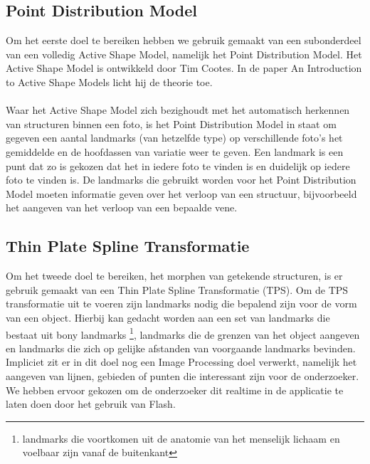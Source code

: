 \subsection{Point Distribution Model}
Om het eerste doel te bereiken hebben we gebruik gemaakt van een subonderdeel van een volledig Active Shape Model, namelijk het Point Distribution Model. Het Active Shape Model is ontwikkeld door Tim Cootes. In de paper An Introduction to Active Shape Models licht hij de theorie toe.\cite{introASM}
\\
\\
Waar het Active Shape Model zich bezighoudt met het automatisch herkennen van structuren binnen een foto, is het Point Distribution Model\cite{pdm} in staat om gegeven een aantal landmarks (van hetzelfde type) op verschillende foto's het gemiddelde en de hoofdassen van variatie weer te geven. Een landmark is een punt dat zo is gekozen dat het in iedere foto te vinden is en duidelijk op iedere foto te vinden is. De landmarks die gebruikt worden voor het Point Distribution Model moeten informatie geven over het verloop van een structuur, bijvoorbeeld het aangeven van het verloop van een bepaalde vene.

\subsection{Thin Plate Spline Transformatie}
Om het tweede doel te bereiken, het morphen van getekende structuren, is er gebruik gemaakt van een Thin Plate Spline Transformatie (TPS). Om de TPS transformatie uit te voeren zijn landmarks nodig die bepalend zijn voor de vorm van een object. Hierbij kan gedacht worden aan een set van landmarks die bestaat uit bony landmarks \footnote{landmarks die voortkomen uit de anatomie van het menselijk lichaam en voelbaar zijn vanaf de buitenkant}, landmarks die de grenzen van het object aangeven en landmarks die zich op gelijke afstanden van voorgaande landmarks bevinden. 
Impliciet zit er in dit doel nog een Image Processing doel verwerkt, namelijk het aangeven van lijnen, gebieden of punten die interessant zijn voor de onderzoeker. We hebben ervoor gekozen om de onderzoeker dit realtime in de applicatie te laten doen door het gebruik van Flash.


